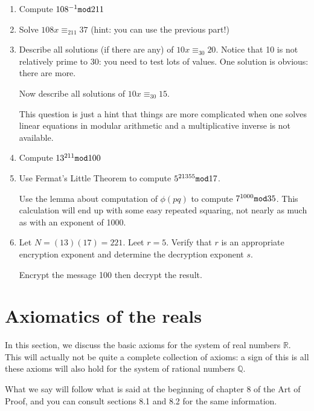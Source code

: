 \documentclass[12pt]{article}
\begin{document}
\begin{enumerate}

\item  Compute $108^{-1} {\tt mod} 211$

\item  Solve $108x \equiv_{211}  37$  (hint:  you can use the previous part!)

\item  Describe all solutions (if there are any) of $10x \equiv_{30} 20$.  Notice that 10 is not relatively prime to 30:  you need to test lots of values.  One solution is obvious:  there are more.

Now describe all solutions of $10x \equiv_{30} 15$.

This question is just a hint that things are more complicated when one solves linear equations in modular arithmetic and a multiplicative inverse is not available.

\item  Compute $13^{211} {\tt mod} 100$

\item  Use Fermat's Little Theorem to compute $5^{21355} {\tt mod} 17$.

Use the lemma about computation of $\phi(pq)$ to compute $7^{1000} {\tt mod} 35$.  This calculation will end up with some easy repeated squaring, not nearly as much as with an exponent of 1000.

\item  Let $N = (13)(17) = 221$.  Leet $r=5$.   Verify that $r$ is an appropriate encryption exponent
and determine the decryption exponent $s$.

Encrypt the message 100 then decrypt the result.


\end{enumerate}

\newpage

\section{Axiomatics of the reals}

In this section, we discuss the basic axioms for the system of real numbers $\mathbb R$.  This will actually not be quite a complete collection of axioms:  a sign of this is all these axioms will also hold for the system of rational numbers $\mathbb Q$.

What we say will follow what is said at the beginning of chapter 8 of the Art of Proof, and you can consult sections 8.1 and 8.2 for the same information.
\end{document}
